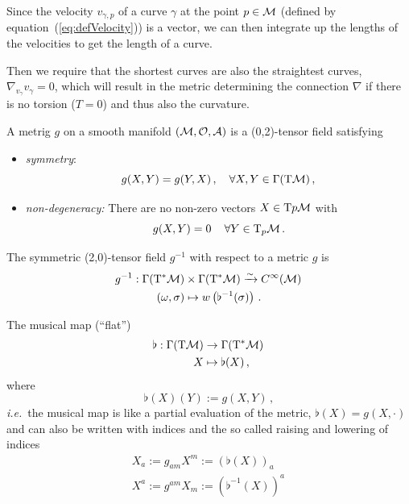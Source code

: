 \documentclass[11pt, a4paper, twocolumn]{article} %
\begin{document}
Since the velocity $v_{\gamma,p}$ of a curve $\gamma$ at the point $p\in\mathcal{M}$
(defined by equation~(\ref{eq:defVelocity})) is a vector, we can then integrate
up the lengths of the velocities to get the length of a curve.

Then we require that the shortest curves are also the straightest curves,
$\nabla_{v_\gamma} v_\gamma=0$, which will result in the metric determining
the connection $\nabla$ if there is no torsion ($T=0$) and thus also the
curvature.

\begin{defn}[Metric]
    A metrig $g$ on a smooth manifold $(\mathcal{M}, \mathcal{O}, \mathcal{A})$ is a
    (0,2)-tensor field satisfying
    \begin{itemize}
        \item \textit{symmetry}:
            \begin{equation}
                g(X,Y) = g(Y,X)\,,\quad\forall X,Y\in\Gamma(\T\M)\,,
            \end{equation}
        \item \textit{non-degeneracy:} There are no non-zero vectors $X\in\T{p}\M$
            with
            \begin{equation}
                g(X,Y) = 0\,\quad \forall Y\in\T_p\M\,.
            \end{equation}

    \end{itemize}
\end{defn}

\begin{defn}
    The symmetric (2,0)-tensor field $g^{-1}$ with respect to a metric $g$ is
    \begin{align}
        g^{-1}: \Gamma(\T^*\M) &\times\Gamma(\T^*\M) \linearto C^\infty(\M)\,\\
        (\omega, \sigma) &\mapsto w\left( \flat^{-1}(\sigma) \right)\,.
    \end{align}
\end{defn}

\begin{defn}
    The musical map (``flat'')
    \begin{align}
        \label{eq:musicalMap}
        \flat: \Gamma(\T\M) &\to \Gamma(\T^*\M)\,\\ 
        X &\mapsto \flat(X)\,,
    \end{align}
    where
    \begin{equation}
        \flat(X)(Y):= g(X,Y)\,,
    \end{equation}
    \textit{i.e.}\ the musical map is like a partial evaluation
    of the metric, $\flat(X) = g(X,\cdot)$ and can also be written
    with indices and the so called raising and lowering of indices
    \begin{align}
        X_a := g_{am}X^m := \left( \flat(X) \right)_a\,\\
        X^a := g^{am}X_m := \left( \flat^{-1}(X) \right)^a\,
    \end{align}
\end{defn}
\end{document}
